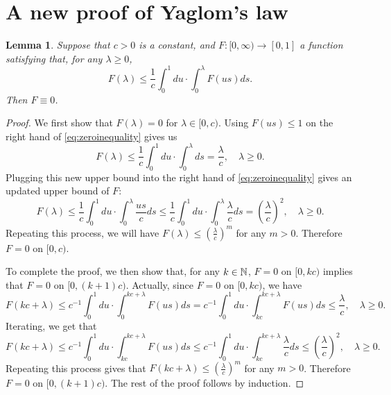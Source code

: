\documentclass[12pt]{amsart}
\newtheorem{lem}[thm]{Lemma}
\theoremstyle{remark}
\numberwithin{equation}{section}
\newcommand{\expr}[1]{\left( #1 \right)}
\begin{document}
\section{A new proof of Yaglom's law}
\label{sec:anewproofofyaglomslaw}
\begin{lem}
\label{lem:zeroinequality}
    Suppose that $c>0$ is a constant,
   and $F:[0,\infty)\to [0,1]$ a function satisfying that, 
    for any $\lambda\geq 0$,
\begin{equation}
\label{eq:zeroinequality}
	    F(\lambda)
	\leq
	    \frac{1}{c}\int_0^1du
	\cdot
	    \int_0^\lambda F(us)ds.
\end{equation}
    Then $F\equiv 0$.
\end{lem}
\begin{proof}
   We first
    show that $F(\lambda)=0$ for $\lambda \in [0,c)$.
    Using  $F(us)\leq 1$
    on the right hand of \eqref{eq:zeroinequality} gives us
\begin{equation*}
        F(\lambda)
    \leq
        \frac{1}{c}\int_0^1du
    \cdot
	    \int_0^\lambda ds
	=
	    \frac{\lambda}{c}
,\quad \lambda\geq 0.
\end{equation*}
Plugging this new upper bound into the right hand 
of \eqref{eq:zeroinequality} gives an updated upper bound of $F$:
\begin{equation*}
        F(\lambda)
    \leq
        \frac{1}{c}\int_0^1du
    \cdot
	    \int_0^\lambda \frac{us}{c}ds
	\leq
        \frac{1}{c}\int_0^1du
    \cdot
	    \int_0^\lambda \frac{\lambda}{c}ds
	=
	    \expr{\frac{\lambda}{c}}^2
,\quad \lambda\geq 0.
\end{equation*}
    Repeating this process, we will have $F(\lambda)\leq (\frac{\lambda}{c})^m$ for any $m>0$. Therefore $F=0$ on $[0,c)$.
\par
    To complete the proof, we then show that, for any $k\in\mathbb N$, $F=0$ on $[0,kc)$ implies that $F=0$ on $[0,(k+1)c)$. 
Actually, since $F=0$ on $[0,kc)$, we have
\begin{equation*}
	    F\expr{kc+\lambda}
	\leq
	    c^{-1}\int_0^1 du\cdot\int_0^{kc+\lambda}F(us)ds
	=
	    c^{-1}\int_0^1du\cdot\int_{kc}^{kc+\lambda} 
	    F(us)ds\leq\frac{\lambda}{c}, \quad \lambda\geq 0.
\end{equation*}
Iterating,  we get that
\begin{equation*}
	    F(kc+\lambda)
	\leq
	    c^{-1}\int_0^1du\cdot\int_{kc}^{kc+\lambda} F(us)ds
	\leq
	    c^{-1}\int_0^1du\cdot\int_{kc}^{kc+\lambda} \frac{\lambda}{c}ds
	\leq\expr{\frac{\lambda}{c}}^2, \quad \lambda\geq 0.
\end{equation*}
	Repeating this process gives that $F(kc+\lambda)\leq (\frac{\lambda}{c})^m$ for any $m>0$. Therefore $F=0$ on $[0,(k+1)c)$. The rest of the proof follows by induction.
\end{proof}
\end{document}
